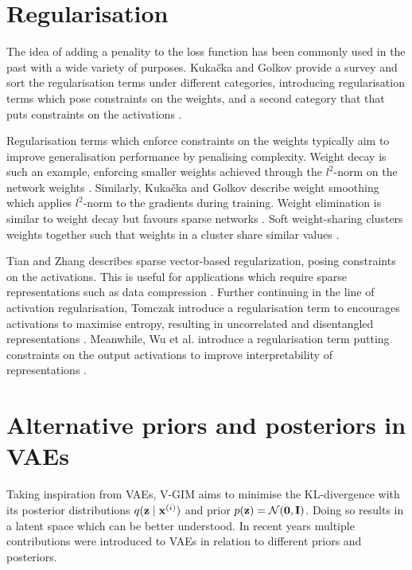 	

\section{Regularisation}
	 The idea of adding a penality to the loss function has been commonly used in the past with a wide variety of purposes. Kukačka and Golkov provide a survey and sort the regularisation terms under different categories, introducing regularisation terms which pose constraints on the weights, and a second category that that puts constraints on the activations \cite{kukackaRegularizationDeepLearning2017}.
	
	Regularisation terms which enforce constraints on the weights typically aim to improve generalisation performance by penalising complexity. Weight decay is such an example, enforcing smaller weights achieved through the $l^2$-norm on the network weights \cite{gneccoWeightdecayTechniqueLearning2009}. Similarly, Kukačka and Golkov describe weight smoothing which applies $l^2$-norm to the gradients during training. Weight elimination is similar to weight decay but favours sparse networks \cite{weigendGeneralizationWeightEliminationApplication1990}. Soft weight-sharing clusters weights together such that weights in a cluster share similar values \cite{nowlanSimplifyingNeuralNetworks1992}.
	
	Tian and Zhang describes sparse vector-based regularization, posing constraints on the activations. This is useful for applications which require sparse representations such as data compression \cite{tianComprehensiveSurveyRegularization2022}. Further continuing in the line of activation regularisation, Tomczak introduce a regularisation term to encourages activations to maximise entropy, resulting in uncorrelated and disentangled representations \cite{tomczakLearningInformativeFeatures2016}. Meanwhile, Wu et al. introduce a regularisation term putting constraints on the output activations to improve interpretability of representations \cite{wuImprovingInterpretabilityRegularization2018}.


\section{Alternative priors and posteriors in VAEs}	%
	Taking inspiration from VAEs, V-GIM aims to minimise the KL-divergence with its posterior distributions $q (\mathbf{z} \mid \mathbf{x}^{(i)})$ and prior $p(\mathbf{z})=\mathcal{N}(\bm{\mathbf{0}}, \mathbf{I})$. Doing so results in a latent space which can be better understood. In recent years multiple contributions were introduced to VAEs in relation to different priors and posteriors.
	
